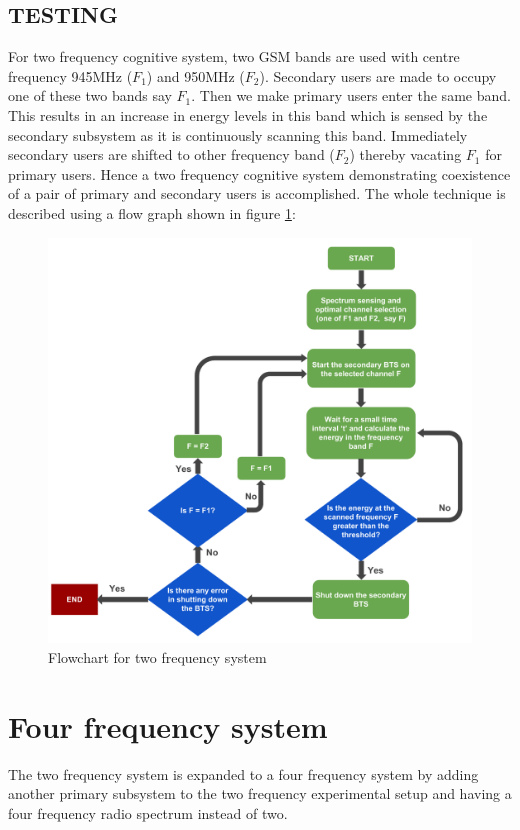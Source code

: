 \subsection{TESTING}
For two frequency cognitive system, two GSM bands are used with centre 
frequency 945MHz ($F_1$) and 950MHz ($F_2$). Secondary users are made to occupy 
one of these two bands say $F_1$. Then we make primary users enter the same 
band. This results in an increase in energy levels in this band which is sensed 
by the secondary subsystem as it is continuously scanning this band. 
Immediately secondary users are shifted to other frequency band ($F_2$) thereby 
vacating $F_1$ for primary users. Hence a two frequency cognitive system 
demonstrating coexistence of a pair of primary and secondary users is 
accomplished. 
The whole technique is described using a flow graph shown in figure
\ref{freqSys2}:

\begin{figure}[!h]
\centering
\includegraphics[width=1\textwidth]{../images/freqSys2}
\caption[Two frequency system]{Flowchart for two frequency system}
\label{freqSys2}
\end{figure}

\section{Four frequency system}
The two frequency system is expanded to a four frequency system by adding 
another primary subsystem to the two frequency experimental setup and having 
a four frequency radio spectrum instead of two. 


